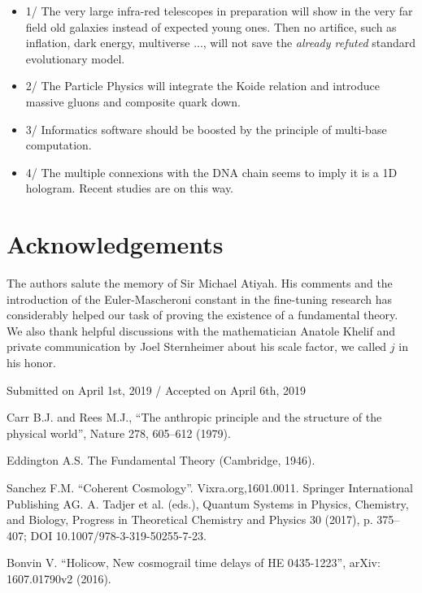 \documentclass[twoside,draft]{article}
\begin{document}
\begin{sloppypar}
{\begin{itemize}
      This article leads to some predictions:
\item 1/  The very large infra-red telescopes in preparation will show in the very far field old galaxies instead of expected young ones. Then no artifice, such as inflation, dark energy, multiverse ..., will not save the \textit{already refuted} standard evolutionary model.
\item 2/ The Particle Physics will integrate the Koide relation and introduce massive gluons and composite quark down.
\item 3/ Informatics software should  be boosted by the principle of multi-base computation.
\item 4/ The multiple connexions with the DNA chain seems to imply it is a 1D hologram. Recent studies \cite{Widom} are on this way. 
\end{itemize}


\section*{Acknowledgements}
The authors salute the memory of Sir Michael Atiyah. His comments and the introduction of the Euler-Mascheroni constant in the fine-tuning research has considerably helped our task
of proving the existence of a fundamental theory. We also thank helpful discussions with the 
mathematician Anatole Khelif and private communication by Joel Sternheimer about his scale factor, 
we called $j$ in his honor.
%
\begin{flushright}\footnotesize
Submitted on April 1st, 2019 / Accepted on April 6th, 2019
\end{flushright}


\begin{thebibliography}{99}\footnotesize

 Carr B.J. and Rees M.J., ``The anthropic principle and the
structure of the physical world'', Nature 278, 605--612 (1979).

 Eddington A.S. The Fundamental Theory (Cambridge, 1946).

 Sanchez F.M. ``Coherent Cosmology''. Vixra.org,1601.0011. Springer
International Publishing AG. A. Tadjer et al. (eds.), Quantum Systems in
Physics, Chemistry, and Biology, Progress in Theoretical Chemistry and Physics
30 (2017), p. 375--407; DOI 10.1007/978-3-319-50255-7-23.

 Bonvin V. ``Holicow, New cosmograil time delays of HE 0435-1223'',
arXiv: 1607.01790v2 (2016).


\end{thebibliography}}
\end{sloppypar}
\end{document}
